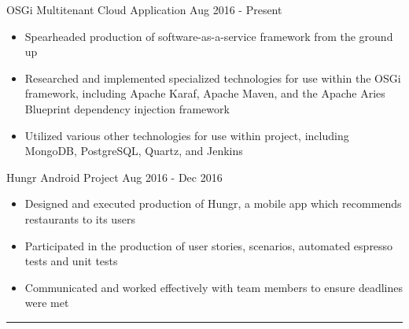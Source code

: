 \documentclass{article}
\begin{document}
\hspace*{0.9in} \begin{itshape}OSGi Multitenant Cloud Application \hfill Aug 2016 - Present\end{itshape}
\begin{itemize}
\setlength{\itemsep}{1pt}
  \setlength{\parskip}{0pt}
  \setlength{\parsep}{0pt}
\setlength{\itemindent}{6em}
\item Spearheaded production of software-as-a-service framework from the ground up
\item Researched and implemented specialized technologies for use within the OSGi framework, including 
\hspace*{0.9in}Apache Karaf, Apache Maven, and the Apache Aries Blueprint dependency injection framework
\item Utilized various other technologies for use within project, including MongoDB, PostgreSQL, Quartz, and 
\hspace*{0.9in}Jenkins
\end{itemize}
\hfill \newline

\hspace*{0.8in}\begin{itshape}Hungr Android Project \hfill Aug 2016 - Dec 2016 \end{itshape}
\begin{itemize}
\setlength{\itemsep}{1pt}
  \setlength{\parskip}{0pt}
  \setlength{\parsep}{0pt}
\setlength{\itemindent}{6em}
\item Designed and executed production of Hungr, a mobile app which recommends restaurants to its users
\item Participated in the production of user stories, scenarios, automated espresso tests and unit tests
\item Communicated and worked effectively with team members to ensure deadlines were met
\end{itemize}

\begin{center} \noindent\rule{12cm}{0.1pt} \end{center}
\end{document}
